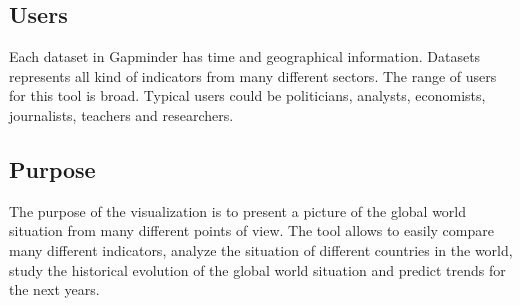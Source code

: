 \subsection{Users}
Each dataset in Gapminder has time and geographical information.
Datasets represents all kind of indicators from many different sectors.
The range of users for this tool is broad.
Typical users could be politicians, analysts, economists, journalists, teachers and researchers.



\subsection{Purpose}
The purpose of the visualization is to present a picture of the global world situation from many different points of view.
The tool allows to easily compare many different indicators, analyze the situation of different countries in the world, study the historical evolution of the global world situation and predict trends for the next years.
